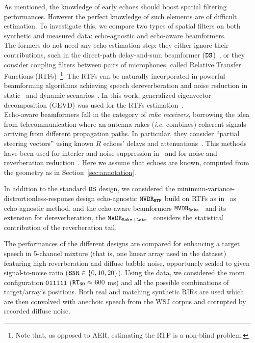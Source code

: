 \newcommand{\corrG}[2]{\sout{#1} {\textcolor{red}{#2}}}

As mentioned, the knowledge of early echoes should boost spatial filtering performances. However the perfect knowledge of such elements are of difficult estimation. To investigate this, we compare two types of spatial filters on both synthetic and measured data: echo-agnostic and echo-aware beamformers.
\\The formers do not need any echo-estimation step: they either ignore their contributions, such in the direct-path delay-and-sum beamformer ($\mathtt{DS}$)~\cite{VanTrees2004Optimum}, or they consider coupling filters between pairs of microphones, called Relative Transfer Functions (RTFs)~\cite{Gannot2001signal}\footnote{Note that, as opposed to AER, estimating the RTF is a non-blind problem.}.
The RTFs can be naturally incorporated in powerful beamforming algorithms achieving speech dereverberation and noise reduction in static~\cite{Schwartz2014multi}
and dynamic scenarios~\cite{Kodrasi2017evd}.
In this work, generalized eigenvector decomposition (GEVD) was used for the RTFs estimation~\cite{doclo2003robust}.
\\Echo-aware beamformers fall in the category of \textit{rake receivers}, borrowing the idea from telecommunication where an antenna rakes (\textit{i.e.} combines) coherent signals arriving from different propagation paths.
In particular, they consider ``partial steering vectors'' using known $R$ echoes' delays and attenuations~\cite{Jan1995matched}. This methods have been used for interfer and noise suppression in~\cite{Dockmanic2015raking} and for noise and reverberation reduction~\cite{Javed2016spherical, Kowalczyk2019raking}. Here we assume that echoes are known, computed from the geometry as in Section~\ref{sec:annotation}.

In addition to the standard $\mathtt{DS}$ design, we considered the minimum-variance-distrortionless-response design
echo-agnostic $\mathtt{MVDR}_\mathtt{RTF}$ build on RTFs as in~\cite{Schwartz2014multi} as echo-agnostic method, and the echo-aware beamformers $\mathtt{MVDR}_\mathtt{Rake}$~\cite{Dockmanic2015raking} and its extension for dereverberation, the $\mathtt{MVDR}_\mathtt{Rake+Late}$~\cite{Kowalczyk2019raking} considers the statistical contribution of the reverberation tail.

The performances of the different designs are compared for enhancing a target speech in 5-channel mixture (that is, one linear array used in the dataset) featuring high reverberation and diffuse babble noise, opportunely scaled to given signal-to-noise  ratio ($\SNR \in \kbrace{0, 10, 20}$).
Using the \dEchorate{} data, we considered the room configuration $\mathtt{011111}$ ($\mathtt{RT}_{60} \approx 600 $ ms) and all the possible combinations of target/array's positions. Both real and matching synthetic RIRs are used which are then convolved with anechoic speech from the WSJ corpus and corrupted by recorded diffuse noise.


